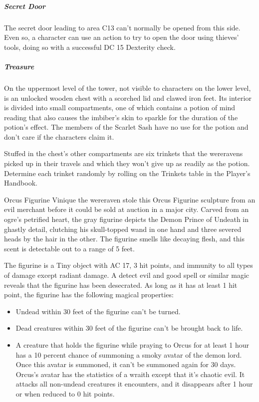 \documentclass[10pt,a4paper,twoside,bg=print,twocolumn,openany,nodeprecatedcode]{dndbook}
\begin{document}
\subparagraph{Secret Door}
The secret door leading to area C13 can't normally be opened from this side. Even so, a character can use an action to try to open the door using thieves' tools, doing so with a successful DC 15 Dexterity check.

\subparagraph{Treasure}
On the uppermost level of the tower, not visible to characters on the lower level, is an unlocked wooden chest with a scorched lid and clawed iron feet. Its interior is divided into small compartments, one of which contains a potion of mind reading that also causes the imbiber's skin to sparkle for the duration of the potion's effect. The members of the Scarlet Sash have no use for the potion and don't care if the characters claim it.

Stuffed in the chest's other compartments are six trinkets that the wereravens picked up in their travels and which they won't give up as readily as the potion. Determine each trinket randomly by rolling on the Trinkets table in the Player's Handbook.

\begin{DndSidebar}[float=!b]{Orcus Figurine}
Vinique the wereraven stole this Orcus Figurine sculpture from an evil merchant before it could be sold at auction in a major city. Carved from an ogre's petrified heart, the gray figurine depicts the Demon Prince of Undeath in ghastly detail, clutching his skull-topped wand in one hand and three severed heads by the hair in the other. The figurine smells like decaying flesh, and this scent is detectable out to a range of 5 feet.



The figurine is a Tiny object with AC 17, 3 hit points, and immunity to all types of damage except radiant damage. A detect evil and good spell or similar magic reveals that the figurine has been desecrated. As long as it has at least 1 hit point, the figurine has the following magical properties:




\begin{itemize}
\item Undead within 30 feet of the figurine can't be turned.
\item Dead creatures within 30 feet of the figurine can't be brought back to life.
\item A creature that holds the figurine while praying to Orcus for at least 1 hour has a 10 percent chance of summoning a smoky avatar of the demon lord. Once this avatar is summoned, it can't be summoned again for 30 days. Orcus's avatar has the statistics of a wraith except that it's chaotic evil. It attacks all non-undead creatures it encounters, and it disappears after 1 hour or when reduced to 0 hit points.
\end{itemize}



\end{DndSidebar}
\end{document}
